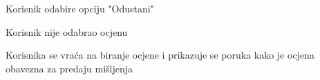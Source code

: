 \begin{packed_item}
\begin{packed_item}
\begin{packed_enum}
								\item Korisnik odabire opciju "Odustani"
								
							\end{packed_enum}
							\item[5.a] Korisnik nije odabrao ocjenu
							\item[] \begin{packed_enum}
								
								\item Korisnika se vraća na biranje ocjene i prikazuje se poruka kako je ocjena obavezna za predaju mišljenja
								
							\end{packed_enum}
							
						\end{packed_item}
					\end{packed_item}
				
